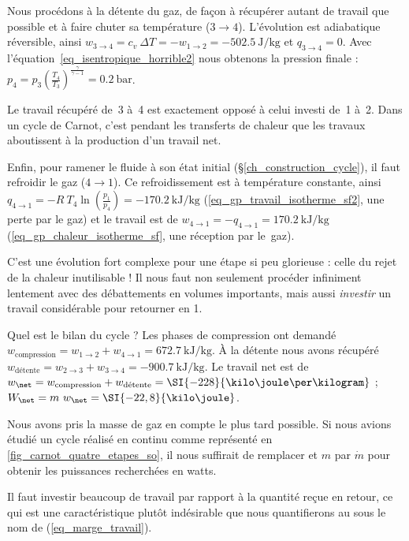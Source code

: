 \begin{anexample}
\begin{answer}
				 	Nous procédons à la détente du gaz, de façon à récupérer autant de travail que possible et à faire chuter sa température ($3 \to 4$). L’évolution est adiabatique réversible, ainsi $w_{3\to 4} = c_v \ \Delta T = -w_{1\to 2} = \SI{-502,5}{\joule\per\kilogram}$ et $q_{3\to 4} = 0$. Avec l’équation~\ref{eq_isentropique_horrible2} nous obtenons la pression finale : $p_4 = p_3 \left(\frac{T_4}{T_3}\right)^{\frac{\gamma}{\gamma - 1}} = \SI{0,2}{\bar}$.
				 		\begin{remark}Le travail récupéré de~3 à~4 est exactement opposé à celui investi de~1 à~2. Dans un cycle de Carnot, c’est pendant les transferts de chaleur que les travaux aboutissent à la production d’un travail net.\end{remark}
				 	Enfin, pour ramener le fluide à son état initial (\S\ref{ch_construction_cycle}), il faut refroidir le gaz ($4 \to 1$). Ce refroidissement est à température constante, ainsi $q_{4 \to 1}
				 	= - R \ T_4 \ln\left(\frac{p_1}{p_4}\right)
				 	= \SI{-170,2}{\kilo\joule\per\kilogram}$ (\ref{eq_gp_travail_isotherme_sf2}, une perte par le gaz) et le travail est de $w_{4 \to 1} = - q_{4 \to 1} = \SI{+170,2}{\kilo\joule\per\kilogram}$ (\ref{eq_gp_chaleur_isotherme_sf}, une réception par le~gaz).
				 		\begin{remark}C’est une évolution fort complexe pour une étape si peu glorieuse : celle du rejet de la chaleur inutilisable ! Il nous faut non seulement procéder infiniment lentement avec des débattements en volumes importants, mais aussi \emph{investir} un travail considérable pour retourner en 1.\end{remark}
				 	Quel est le bilan du cycle ? Les phases de compression ont demandé $w_\text{compression}
				 	= w_{1\to 2} + w_{4\to 1} = \SI{+672,7}{\kilo\joule\per\kilogram}$.
				 	À la détente nous avons récupéré $w_\text{détente}
				 	= w_{2\to 3} + w_{3\to 4} = \SI{-900,7}{\kilo\joule\per\kilogram}$.
				 	Le travail net est de $w_\net
				 	= w_\text{compression} + w_\text{détente} = \SI{-228}{\kilo\joule\per\kilogram}$ ;
				 	$W_\net = m \ w_\net = \SI{-22,8}{\kilo\joule}$.
				 		\begin{remark}Nous avons pris la masse de gaz en compte le plus tard possible. Si nous avions étudié un cycle réalisé en continu comme représenté en \cref{fig_carnot_quatre_etapes_so}, il nous suffirait de remplacer et $m$ par $\dot m$ pour obtenir les puissances recherchées en \si{watts}.\end{remark}
				 		\begin{remark}Il faut investir beaucoup de travail par rapport à la quantité reçue en retour, ce qui est une caractéristique plutôt indésirable que nous quantifierons au \coursdix sous le nom de  (\ref{eq_marge_travail}).\end{remark}

\end{answer}
\end{anexample}
